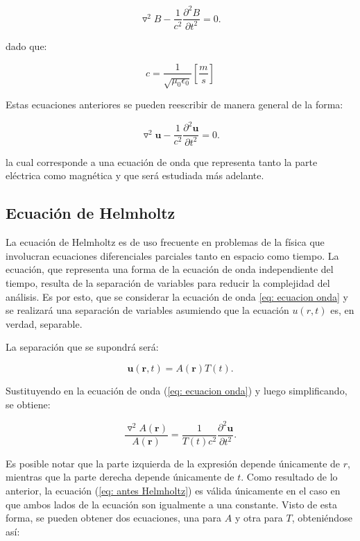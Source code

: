 \documentclass[12pt,letterpaper]{article}
\numberwithin{equation}{section}
\begin{document}
\begin{equation}
\triangledown^2B - \frac{1}{c^2}\frac{\partial^2B}{\partial t^2}= 0.
\label{eq: ecuacion onda magnetica}
\end{equation}

\noindent dado que:

$$c = \frac{1}{\sqrt{\mu_0\epsilon_0}} \left[\frac{m}{s}\right]$$

\noindent Estas ecuaciones anteriores se pueden reescribir de manera general de la forma:

\begin{equation}
\triangledown^2\textbf{u} - \frac{1}{c^2}\frac{\partial^2\textbf{u}}{\partial t^2}= 0.
\label{eq: ecuacion onda}
\end{equation} 

\noindent la cual corresponde a una ecuación de onda que representa tanto la parte eléctrica como magnética y que será estudiada más adelante. 


\subsection{Ecuación de Helmholtz}

La ecuación de Helmholtz es de uso frecuente en problemas de la física que involucran ecuaciones diferenciales parciales tanto en espacio como tiempo. La ecuación, que representa una forma de la ecuación de onda independiente del tiempo, resulta de la separación de variables para reducir la complejidad del análisis. Es por esto, que se considerar la ecuación de onda \ref{eq: ecuacion onda} y se realizará una separación de variables asumiendo que la ecuación $u(r,t)$ es, en verdad, separable.

\noindent La separación que se supondrá será:


$$\textbf{u}(\textbf{r},t)=A(\textbf{r})T(t).$$

\noindent Sustituyendo en la ecuación de onda (\ref{eq: ecuacion onda}) y luego simplificando, se obtiene:

\begin{equation}
\frac{\triangledown^2A(\textbf{r})}{A(\textbf{r})} = \frac{1}{T(t)c^2}\frac{\partial^2\textbf{u}}{\partial t^2}.
\label{eq: antes Helmholtz}
\end{equation}

Es posible notar que la parte izquierda de la expresión depende únicamente de $r$, mientras que la parte derecha depende únicamente de $t$. Como resultado de lo anterior, la ecuación (\ref{eq: antes Helmholtz}) es válida únicamente en el caso en que ambos lados de la ecuación son igualmente a una constante. Visto de esta forma, se pueden obtener dos ecuaciones, una para $A$ y otra para $T$, obteniéndose así:
\end{document}
